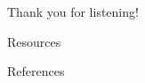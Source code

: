 \appendix
\begin{frame}[c]
\begin{center}
\LARGE Thank you for listening!
\end{center}
\end{frame}

\begin{frame}{Resources}{}
\end{frame}

\begin{frame}{References}{}
\printbibliography[heading=none]
\end{frame}